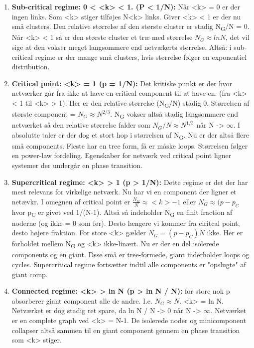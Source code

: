 \documentclass[11pt]{article}
\begin{document}
\begin{enumerate}
\item \textbf{Sub-critical regime: 0 < <k> < 1. (P < 1/N):} Når <k> = 0 er der ingen links. Som <k> stiger tilføjes N<k> links. Giver <k> < 1 er der nu små clusters. Den relative størrelse af den største cluster er stadig N\textsubscript{G}/N = 0. Når <k> < 1 så er den største cluster et træ med størrelse \(N_G \approx ln N\), det vil sige at den vokser meget langsommere end netvækerts størrelse. Altså: i sub-critical regime er der mange små clusters, hvis størrelse følger en exponentiel distribution.
\item \textbf{Critical point: <k> = 1 (p = 1/N):} Det kritiske punkt er der hvor netværker går fra ikke at have en critical component til at have en. (fra <k> < 1 til <k> > 1). Her er den relative størrelse (N\textsubscript{G}/N) stadig 0. Størrelsen af største component = \(N_G \approx N^{2/3}\). N\textsubscript{G} vokser altså stadig langsommere end netværket så den relative størrelse falder som \(N_G/N \approx N^{1/3}\) når N -> \(\infty\). I absolutte taler er der dog et stort  hop i størrelsen af N\textsubscript{G}. Nu er der altså flere små components. Fleste har en tree form, få er måske loops. Størrelsen følger en power-law fordeling. Egenskaber for netværk ved critical point ligner systemer der undergår en phase transition.
\item \textbf{Supercritical regime: <k> > 1 (p > 1/N):} Dette regime er det der har mest relevans for virkelige netværk. Nu har vi en component der ligner et netævkr. I omegnen af critical point er \(\frac{N_G}{N} \approx <k> - 1\) eller \(N_G \approx (p - p_{C}\) hvor p\textsubscript{C} er givet ved 1/(N-1). Altså så indeholder N\textsubscript{G} en finit fraction af noderne (og ikke = 0 som før). Desto længere vi kommer fra ciritcal point, desto højere fraktion. For store <k> gælder \(N_G = (p - p_C)N\) ikke. Her er forholdet mellem N\textsubscript{G} og <k> ikke-linært. Nu er der en del isolerede components og en giant. Dsse små er tree-formede, giant inderholder loops og cycles. Supercritical regime fortsætter indtil alle components er "opslugte" af giant comp.
\item \textbf{Connected regime: <k> > ln N (p > ln N / N):} for store nok p absorberer giant component alle de andre. I.e. \(N_G \approx N\). <k> = ln N. Netværket er dog stadig ret spare, da ln N / N -> 0 når N -> \(\infty\). Netværket er en complete graph ved <k> = N-1. De isolerede noder og minicomponent collapser altså sammen til en giant component gennem en phase transition som <k> stiger.
\end{enumerate}
\end{document}

